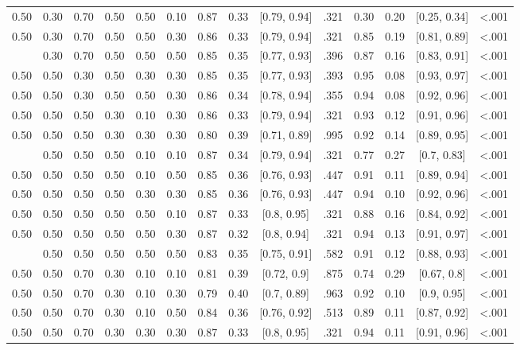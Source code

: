 \documentclass[
  11pt,
]{article}
\begin{document}
\begin{landscape}
\begin{ThreePartTable}
\begin{longtable}[t]{cccccccccccccc}
0.50 & 0.30 & 0.70 & 0.50 & 0.50 & 0.10 & 0.87 & 0.33 & {}[0.79, 0.94] & .321 & 0.30 & 0.20 & {}[0.25, 0.34] & <.001\\
0.50 & 0.30 & 0.70 & 0.50 & 0.50 & 0.30 & 0.86 & 0.33 & {}[0.79, 0.94] & .321 & 0.85 & 0.19 & {}[0.81, 0.89] & <.001\\
\addlinespace
0.50 & 0.30 & 0.70 & 0.50 & 0.50 & 0.50 & 0.85 & 0.35 & {}[0.77, 0.93] & .396 & 0.87 & 0.16 & {}[0.83, 0.91] & <.001\\
0.50 & 0.50 & 0.30 & 0.50 & 0.30 & 0.30 & 0.85 & 0.35 & {}[0.77, 0.93] & .393 & 0.95 & 0.08 & {}[0.93, 0.97] & <.001\\
0.50 & 0.50 & 0.30 & 0.50 & 0.50 & 0.30 & 0.86 & 0.34 & {}[0.78, 0.94] & .355 & 0.94 & 0.08 & {}[0.92, 0.96] & <.001\\
0.50 & 0.50 & 0.50 & 0.30 & 0.10 & 0.30 & 0.86 & 0.33 & {}[0.79, 0.94] & .321 & 0.93 & 0.12 & {}[0.91, 0.96] & <.001\\
0.50 & 0.50 & 0.50 & 0.30 & 0.30 & 0.30 & 0.80 & 0.39 & {}[0.71, 0.89] & .995 & 0.92 & 0.14 & {}[0.89, 0.95] & <.001\\
\addlinespace
0.50 & 0.50 & 0.50 & 0.50 & 0.10 & 0.10 & 0.87 & 0.34 & {}[0.79, 0.94] & .321 & 0.77 & 0.27 & {}[0.7, 0.83] & <.001\\
0.50 & 0.50 & 0.50 & 0.50 & 0.10 & 0.50 & 0.85 & 0.36 & {}[0.76, 0.93] & .447 & 0.91 & 0.11 & {}[0.89, 0.94] & <.001\\
0.50 & 0.50 & 0.50 & 0.50 & 0.30 & 0.30 & 0.85 & 0.36 & {}[0.76, 0.93] & .447 & 0.94 & 0.10 & {}[0.92, 0.96] & <.001\\
0.50 & 0.50 & 0.50 & 0.50 & 0.50 & 0.10 & 0.87 & 0.33 & {}[0.8, 0.95] & .321 & 0.88 & 0.16 & {}[0.84, 0.92] & <.001\\
0.50 & 0.50 & 0.50 & 0.50 & 0.50 & 0.30 & 0.87 & 0.32 & {}[0.8, 0.94] & .321 & 0.94 & 0.13 & {}[0.91, 0.97] & <.001\\
\addlinespace
0.50 & 0.50 & 0.50 & 0.50 & 0.50 & 0.50 & 0.83 & 0.35 & {}[0.75, 0.91] & .582 & 0.91 & 0.12 & {}[0.88, 0.93] & <.001\\
0.50 & 0.50 & 0.70 & 0.30 & 0.10 & 0.10 & 0.81 & 0.39 & {}[0.72, 0.9] & .875 & 0.74 & 0.29 & {}[0.67, 0.8] & <.001\\
0.50 & 0.50 & 0.70 & 0.30 & 0.10 & 0.30 & 0.79 & 0.40 & {}[0.7, 0.89] & .963 & 0.92 & 0.10 & {}[0.9, 0.95] & <.001\\
0.50 & 0.50 & 0.70 & 0.30 & 0.10 & 0.50 & 0.84 & 0.36 & {}[0.76, 0.92] & .513 & 0.89 & 0.11 & {}[0.87, 0.92] & <.001\\
0.50 & 0.50 & 0.70 & 0.30 & 0.30 & 0.30 & 0.87 & 0.33 & {}[0.8, 0.95] & .321 & 0.94 & 0.11 & {}[0.91, 0.96] & <.001\\

\end{longtable}
\end{ThreePartTable}
\end{landscape}
\end{document}
